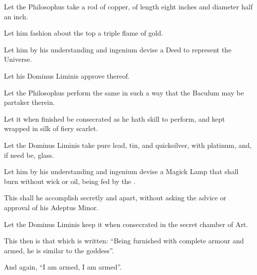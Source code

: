 \begin{description}
\item Let the Philosophus take a rod of copper, of length eight inches and diameter half an inch.
\item Let him fashion about the top a triple flame of gold.
\item Let him by his understanding and ingenium devise a Deed to represent the Universe.
\item Let his Dominus Liminis approve thereof.
\item Let the Philosophus perform the same in such a way that the Baculum may be partaker therein.
\item Let it when finished be consecrated as he hath skill to perform, and kept wrapped in silk of fiery scarlet.
\end{description}

\begin{description}
\item Let the Dominus Liminis take pure lead, tin, and quicksilver, with platinum, and, if need be, glass.
\item Let him by his understanding and ingenium devise a Magick Lamp that shall burn without wick or oil, being fed by the \AEthyr.
\item This shall he accomplish secretly and apart, without asking the advice or approval of his Adeptus Minor.
\item Let the Dominus Liminis keep it when consecrated in the secret chamber of Art.
\item This then is that which is written: \enquote{Being furnished with complete armour and armed, he is similar to the goddess}.
\item And again, \enquote{I am armed, I am armed}.
\end{description}
